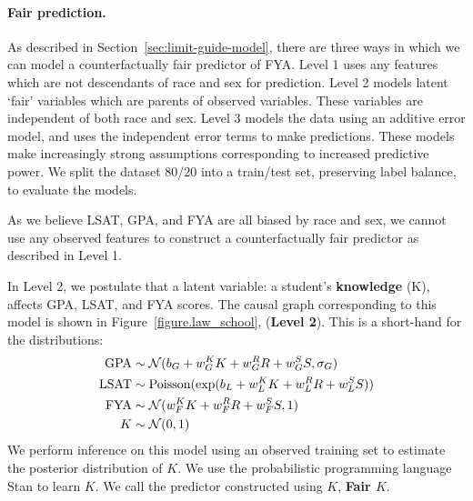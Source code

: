 \paragraph{Fair prediction.}
As described in Section~\ref{sec:limit-guide-model}, there are three ways in which we can model a counterfactually fair predictor of FYA. Level 1 uses any features which are not descendants of race and sex for prediction. Level 2 models latent `fair' variables which are parents of observed variables. These variables are independent of both race and sex. Level 3 models the data using an additive error model, and uses the independent error terms to make predictions. These models make increasingly strong assumptions corresponding to increased predictive power. We split the dataset 80/20 into a train/test set, preserving label balance, to evaluate the models.

As we believe LSAT, GPA, and FYA are all biased by race and sex, we
cannot use any observed features to construct a counterfactually fair
predictor as described in Level 1. %

In Level 2, we postulate that a latent variable: a student's \textbf{knowledge} (K), affects GPA, LSAT, and FYA scores. The causal graph corresponding to this model is shown in Figure~\ref{figure.law_school}, (\textbf{Level 2}). This is a short-hand for the distributions:
\begin{align}
\mbox{GPA} &\sim {\cal N}(b_{G} + w_{G}^K K + w_{G}^R R + w_{G}^S S, \sigma_{G}) \nonumber \\
\mbox{LSAT} &\sim \textrm{Poisson}(\exp(b_{L} + w_{L}^K K + w_{L}^R R + w_{L}^S S)) \nonumber \\
\mbox{FYA} &\sim {\cal N}(w_{F}^K K + w_{F}^R R + w_{F}^S S, 1) \nonumber \\
K &\sim {\cal N}(0,1) \nonumber
\end{align}
We perform inference on this model using an observed training set to estimate the posterior distribution of $K$. We use the probabilistic programming language Stan \cite{rstan} to learn $K$. We call the predictor constructed using $K$, \textbf{Fair $K$}.


